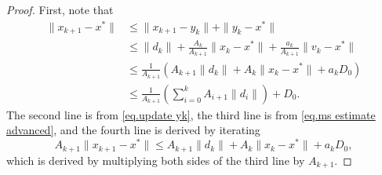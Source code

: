 \documentclass{article}
\begin{document}
\begin{proof}
    First, note that
    \begin{equation*}
    \begin{aligned}
        \|x_{k+1}-x^*\| &\leq \|x_{k+1}-y_k\| + \|y_k-x^*\|\\
        & \leq \|d_k\|+ \frac{A_k}{A_{k+1}} \|x_k-x^*\| +\frac{a_k}{A_{k+1}}\|v_k-x^*\| \\
        &\leq \frac{1}{A_{k+1}}\left(A_{k+1}\|d_k\| +A_k\|x_k-x^*\| +  a_k D_0\right)\\
        &\leq \frac{1}{A_{k+1}}\left (\sum_{i=0}^k A_{i+1}\|d_i\|\right)+D_0.
        \end{aligned}
    \end{equation*}
    The second line is from \eqref{eq.update yk}, the third line is from \eqref{eq.ms estimate advanced}, and the fourth line is derived by iterating 
    \begin{equation*}
        A_{k+1} \|x_{k+1}-x^*\|\leq A_{k+1}\|d_k\|+A_k\|x_k-x^*\|+a_k D_0,
    \end{equation*}
    which is derived by multiplying both sides of the third line by $A_{k+1}$.


\end{proof}
\end{document}
